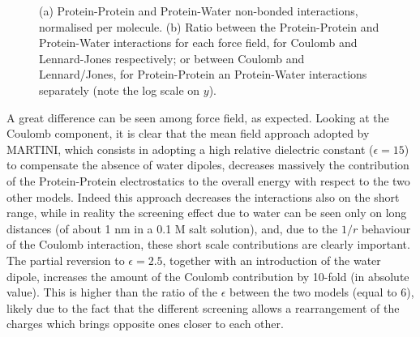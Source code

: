 \begin{figure}[p!]
\centering
{} 
\caption[Non-bonded protein energy contribution to capsule structures]{(a) Protein-Protein and Protein-Water non-bonded interactions, normalised per molecule. (b) Ratio between the Protein-Protein and Protein-Water interactions for each force field, for Coulomb and Lennard-Jones respectively; or between Coulomb and Lennard/Jones, for Protein-Protein an Protein-Water interactions separately (note the log scale on $y$).}
\label{fig:eng_cg}
\end{figure}

A great difference can be seen among force field, as expected. Looking at the Coulomb component, it is clear that the mean field approach adopted by MARTINI, which consists in adopting a high relative dielectric constant ($\epsilon = 15$) to compensate the absence of water dipoles, decreases massively the contribution of the Protein-Protein electrostatics to the overall energy with respect to the two other models. Indeed this approach decreases the interactions also on the short range, while in reality the screening effect due to water can be seen only on long distances (of about 1 nm in a 0.1 M salt solution), and, due to the $1/r$ behaviour of the Coulomb interaction, these short scale contributions are clearly important.
%
The partial reversion to $\epsilon = 2.5$, together with an introduction of the water dipole, increases the amount of the Coulomb contribution by 10-fold (in absolute value).
%
This is higher than the ratio of the $\epsilon$ between the two models (equal to $6$), likely due to the fact that the different screening allows a rearrangement of the charges which brings opposite ones closer to each other.

